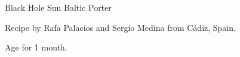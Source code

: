 \stylesection{\stylebalticporter}

\begin{recipe}{Black Hole Sun Baltic Porter}

\begin{aboutblock}
Recipe by Rafa Palacios and Sergio Medina from Cádiz, Spain.
\sourceaha
\end{aboutblock}


\begin{methodandtiming}

\begin{mashsteps}
\end{mashsteps}

\begin{fermentationsteps}
\end{fermentationsteps}

\begin{directions}
Age for 1 month.
\end{directions}

\end{methodandtiming}

\recipebreak

\begin{ingredientsblock}

\begin{malts}
\end{malts}

\begin{hops}
\end{hops}


\end{ingredientsblock}

\end{recipe}


